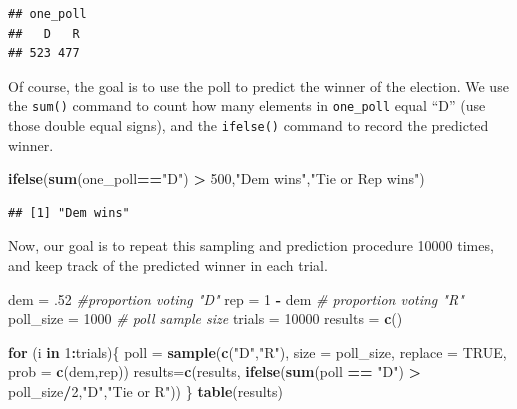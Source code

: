 \documentclass[
]{book}
\newenvironment{Shaded}{\begin{snugshade}}{\end{snugshade}}
\newcommand{\AttributeTok}[1]{\textcolor[rgb]{0.13,0.29,0.53}{#1}}
\newcommand{\CommentTok}[1]{\textcolor[rgb]{0.56,0.35,0.01}{\textit{#1}}}
\newcommand{\ConstantTok}[1]{\textcolor[rgb]{0.56,0.35,0.01}{#1}}
\newcommand{\ControlFlowTok}[1]{\textcolor[rgb]{0.13,0.29,0.53}{\textbf{#1}}}
\newcommand{\DecValTok}[1]{\textcolor[rgb]{0.00,0.00,0.81}{#1}}
\newcommand{\FunctionTok}[1]{\textcolor[rgb]{0.13,0.29,0.53}{\textbf{#1}}}
\newcommand{\NormalTok}[1]{#1}
\newcommand{\OtherTok}[1]{\textcolor[rgb]{0.56,0.35,0.01}{#1}}
\newcommand{\SpecialCharTok}[1]{\textcolor[rgb]{0.81,0.36,0.00}{\textbf{#1}}}
\newcommand{\StringTok}[1]{\textcolor[rgb]{0.31,0.60,0.02}{#1}}
\theoremstyle{definition}
\theoremstyle{definition}
\theoremstyle{definition}
\theoremstyle{definition}
\theoremstyle{remark}
\begin{document}
\begin{verbatim}
## one_poll
##   D   R 
## 523 477
\end{verbatim}

Of course, the goal is to use the poll to predict the winner of the election.
We use the \texttt{sum()} command to count how many elements in \texttt{one\_poll} equal ``D'' (use those double equal signs), and the \texttt{ifelse()} command to record the predicted winner.

\begin{Shaded}
\begin{Highlighting}[]
\FunctionTok{ifelse}\NormalTok{(}\FunctionTok{sum}\NormalTok{(one\_poll}\SpecialCharTok{==}\StringTok{"D"}\NormalTok{) }\SpecialCharTok{\textgreater{}} \DecValTok{500}\NormalTok{,}\StringTok{"Dem wins"}\NormalTok{,}\StringTok{"Tie or Rep wins"}\NormalTok{)}
\end{Highlighting}
\end{Shaded}

\begin{verbatim}
## [1] "Dem wins"
\end{verbatim}

Now, our goal is to repeat this sampling and prediction procedure 10000 times, and keep track of the predicted winner in each trial.

\begin{Shaded}
\begin{Highlighting}[]
\NormalTok{dem }\OtherTok{=}\NormalTok{ .}\DecValTok{52} \CommentTok{\#proportion voting "D"}
\NormalTok{rep }\OtherTok{=} \DecValTok{1} \SpecialCharTok{{-}}\NormalTok{ dem }\CommentTok{\# proportion voting "R"}
\NormalTok{poll\_size }\OtherTok{=} \DecValTok{1000} \CommentTok{\# poll sample size}
\NormalTok{trials }\OtherTok{=} \DecValTok{10000}
\NormalTok{results }\OtherTok{=} \FunctionTok{c}\NormalTok{()}

\ControlFlowTok{for}\NormalTok{ (i }\ControlFlowTok{in} \DecValTok{1}\SpecialCharTok{:}\NormalTok{trials)\{}
\NormalTok{  poll }\OtherTok{=} \FunctionTok{sample}\NormalTok{(}\FunctionTok{c}\NormalTok{(}\StringTok{"D"}\NormalTok{,}\StringTok{"R"}\NormalTok{),}
                \AttributeTok{size =}\NormalTok{ poll\_size,}
                \AttributeTok{replace =} \ConstantTok{TRUE}\NormalTok{,}
                \AttributeTok{prob =} \FunctionTok{c}\NormalTok{(dem,rep))}
\NormalTok{  results}\OtherTok{=}\FunctionTok{c}\NormalTok{(results,}
            \FunctionTok{ifelse}\NormalTok{(}\FunctionTok{sum}\NormalTok{(poll }\SpecialCharTok{==} \StringTok{"D"}\NormalTok{) }\SpecialCharTok{\textgreater{}}\NormalTok{ poll\_size}\SpecialCharTok{/}\DecValTok{2}\NormalTok{,}\StringTok{"D"}\NormalTok{,}\StringTok{"Tie or R"}\NormalTok{))}
\NormalTok{\}}
\FunctionTok{table}\NormalTok{(results)}
\end{Highlighting}
\end{Shaded}
\end{document}
